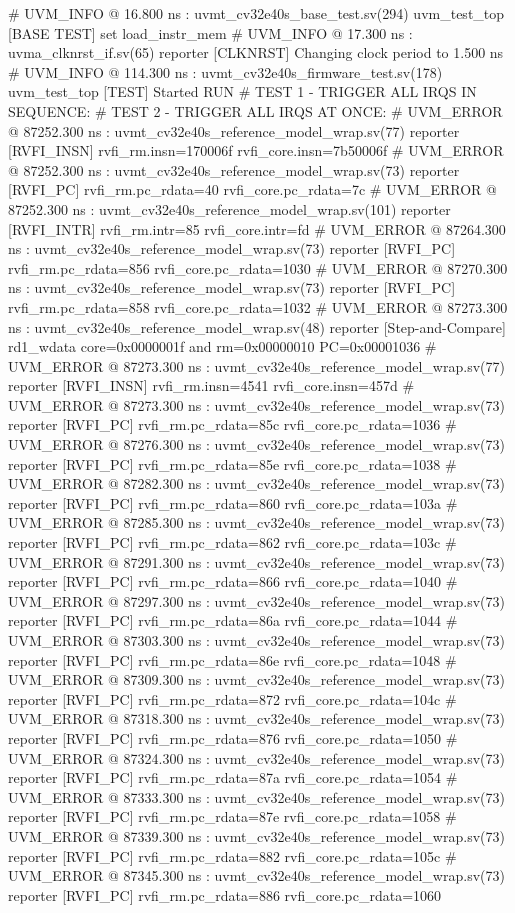 \begin{terminal}
# UVM_INFO @ 16.800 ns : uvmt_cv32e40s_base_test.sv(294) uvm_test_top [BASE TEST] set load_instr_mem
# UVM_INFO @ 17.300 ns : uvma_clknrst_if.sv(65) reporter [CLKNRST] Changing clock period to 1.500 ns
# UVM_INFO @ 114.300 ns : uvmt_cv32e40s_firmware_test.sv(178) uvm_test_top [TEST] Started RUN
# TEST 1 - TRIGGER ALL IRQS IN SEQUENCE:
# TEST 2 - TRIGGER ALL IRQS AT ONCE:
# UVM_ERROR @ 87252.300 ns : uvmt_cv32e40s_reference_model_wrap.sv(77) reporter [RVFI_INSN] rvfi_rm.insn=170006f rvfi_core.insn=7b50006f
# UVM_ERROR @ 87252.300 ns : uvmt_cv32e40s_reference_model_wrap.sv(73) reporter [RVFI_PC] rvfi_rm.pc_rdata=40 rvfi_core.pc_rdata=7c
# UVM_ERROR @ 87252.300 ns : uvmt_cv32e40s_reference_model_wrap.sv(101) reporter [RVFI_INTR] rvfi_rm.intr=85 rvfi_core.intr=fd
# UVM_ERROR @ 87264.300 ns : uvmt_cv32e40s_reference_model_wrap.sv(73) reporter [RVFI_PC] rvfi_rm.pc_rdata=856 rvfi_core.pc_rdata=1030
# UVM_ERROR @ 87270.300 ns : uvmt_cv32e40s_reference_model_wrap.sv(73) reporter [RVFI_PC] rvfi_rm.pc_rdata=858 rvfi_core.pc_rdata=1032
# UVM_ERROR @ 87273.300 ns : uvmt_cv32e40s_reference_model_wrap.sv(48) reporter [Step-and-Compare] rd1_wdata core=0x0000001f and rm=0x00000010 PC=0x00001036
# UVM_ERROR @ 87273.300 ns : uvmt_cv32e40s_reference_model_wrap.sv(77) reporter [RVFI_INSN] rvfi_rm.insn=4541 rvfi_core.insn=457d
# UVM_ERROR @ 87273.300 ns : uvmt_cv32e40s_reference_model_wrap.sv(73) reporter [RVFI_PC] rvfi_rm.pc_rdata=85c rvfi_core.pc_rdata=1036
# UVM_ERROR @ 87276.300 ns : uvmt_cv32e40s_reference_model_wrap.sv(73) reporter [RVFI_PC] rvfi_rm.pc_rdata=85e rvfi_core.pc_rdata=1038
# UVM_ERROR @ 87282.300 ns : uvmt_cv32e40s_reference_model_wrap.sv(73) reporter [RVFI_PC] rvfi_rm.pc_rdata=860 rvfi_core.pc_rdata=103a
# UVM_ERROR @ 87285.300 ns : uvmt_cv32e40s_reference_model_wrap.sv(73) reporter [RVFI_PC] rvfi_rm.pc_rdata=862 rvfi_core.pc_rdata=103c
# UVM_ERROR @ 87291.300 ns : uvmt_cv32e40s_reference_model_wrap.sv(73) reporter [RVFI_PC] rvfi_rm.pc_rdata=866 rvfi_core.pc_rdata=1040
# UVM_ERROR @ 87297.300 ns : uvmt_cv32e40s_reference_model_wrap.sv(73) reporter [RVFI_PC] rvfi_rm.pc_rdata=86a rvfi_core.pc_rdata=1044
# UVM_ERROR @ 87303.300 ns : uvmt_cv32e40s_reference_model_wrap.sv(73) reporter [RVFI_PC] rvfi_rm.pc_rdata=86e rvfi_core.pc_rdata=1048
# UVM_ERROR @ 87309.300 ns : uvmt_cv32e40s_reference_model_wrap.sv(73) reporter [RVFI_PC] rvfi_rm.pc_rdata=872 rvfi_core.pc_rdata=104c
# UVM_ERROR @ 87318.300 ns : uvmt_cv32e40s_reference_model_wrap.sv(73) reporter [RVFI_PC] rvfi_rm.pc_rdata=876 rvfi_core.pc_rdata=1050
# UVM_ERROR @ 87324.300 ns : uvmt_cv32e40s_reference_model_wrap.sv(73) reporter [RVFI_PC] rvfi_rm.pc_rdata=87a rvfi_core.pc_rdata=1054
# UVM_ERROR @ 87333.300 ns : uvmt_cv32e40s_reference_model_wrap.sv(73) reporter [RVFI_PC] rvfi_rm.pc_rdata=87e rvfi_core.pc_rdata=1058
# UVM_ERROR @ 87339.300 ns : uvmt_cv32e40s_reference_model_wrap.sv(73) reporter [RVFI_PC] rvfi_rm.pc_rdata=882 rvfi_core.pc_rdata=105c
# UVM_ERROR @ 87345.300 ns : uvmt_cv32e40s_reference_model_wrap.sv(73) reporter [RVFI_PC] rvfi_rm.pc_rdata=886 rvfi_core.pc_rdata=1060

\end{terminal}


